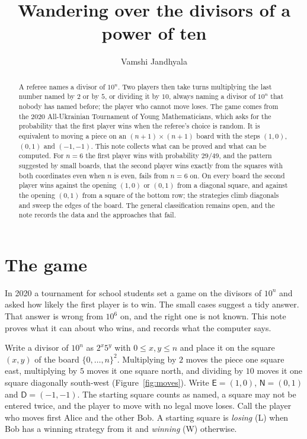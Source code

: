 \documentclass[11pt]{article}
\title{Wandering over the divisors of a power of ten}
\author{Vamshi Jandhyala}
\date{}
\theoremstyle{remark}
\newcommand{\E}{\mathsf{E}}
\newcommand{\N}{\mathsf{N}}
\newcommand{\D}{\mathsf{D}}
\begin{document}
\maketitle
\vspace{-2em}

\begin{abstract}
A referee names a divisor of $10^n$. Two players then take turns multiplying the last number
named by $2$ or by $5$, or dividing it by $10$, always naming a divisor of $10^n$ that nobody has
named before; the player who cannot move loses. The game comes from the 2020 All-Ukrainian
Tournament of Young Mathematicians, which asks for the probability that the first player wins
when the referee's choice is random. It is equivalent to moving a piece on an $(n+1)\times(n+1)$
board with the steps $(1,0)$, $(0,1)$ and $(-1,-1)$. This note collects what can be proved and
what can be computed. For $n=6$ the first player wins with probability $29/49$, and the
pattern suggested by small boards, that the second player wins exactly from the squares with
both coordinates even when $n$ is even, fails from $n=6$ on. On every board the second player
wins against the opening $(1,0)$ or $(0,1)$ from a diagonal square, and against the opening
$(0,1)$ from a square of the bottom row; the strategies climb diagonals and sweep the edges of
the board. The general classification remains open, and the note records the data and the
approaches that fail.
\end{abstract}

\section{The game}

In 2020 a tournament for school students set a game on the divisors of $10^n$ and asked how
likely the first player is to win. The small cases suggest a tidy answer. That answer is wrong
from $10^6$ on, and the right one is not known. This note proves what it can about who wins,
and records what the computer says.

Write a divisor of $10^n$ as $2^x5^y$ with $0\le x,y\le n$ and place it on the square $(x,y)$
of the board $\{0,\dots,n\}^2$. Multiplying by $2$ moves the piece one square east, multiplying
by $5$ moves it one square north, and dividing by $10$ moves it one square diagonally south-west
(Figure~\ref{fig:moves}). Write $\E=(1,0)$, $\N=(0,1)$ and $\D=(-1,-1)$. The starting square
counts as named, a square may not be entered twice, and the player to move with no legal move
loses. Call the player who moves first Alice and the other Bob. A starting square is
\emph{losing} (L) when Bob has a winning strategy from it and \emph{winning} (W) otherwise.
\end{document}
